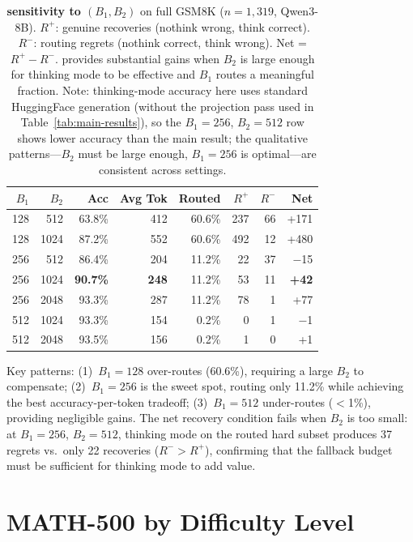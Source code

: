 \begin{table}[ht]
\centering
\caption{\textbf{\method{} sensitivity to $(B_1, B_2)$} on full GSM8K
($n{=}1{,}319$, Qwen3-8B).
$R^+$: genuine recoveries (nothink wrong, think correct).
$R^-$: routing regrets (nothink correct, think wrong).
Net = $R^+ - R^-$.
\method{} provides substantial gains when $B_2$ is large enough for
thinking mode to be effective and $B_1$ routes a meaningful fraction.
Note: thinking-mode accuracy here uses standard HuggingFace generation
(without the projection pass used in Table~\ref{tab:main-results}),
so the $B_1{=}256$, $B_2{=}512$ row shows lower accuracy than the main
\method{} result; the qualitative patterns---$B_2$ must be large
enough, $B_1{=}256$ is optimal---are consistent across settings.}
\label{tab:town-grid}
\small
\begin{tabular}{rr|rrrrrr}
\toprule
$B_1$ & $B_2$ & \textbf{Acc} & \textbf{Avg Tok} & \textbf{Routed} & $R^+$ & $R^-$ & \textbf{Net} \\
\midrule
128 & 512 & 63.8\% & 412 & 60.6\% & 237 & 66 & +171 \\
128 & 1024 & 87.2\% & 552 & 60.6\% & 492 & 12 & +480 \\
\midrule
256 & 512 & 86.4\% & 204 & 11.2\% & 22 & 37 & $-$15 \\
256 & 1024 & \textbf{90.7\%} & \textbf{248} & 11.2\% & 53 & 11 & \textbf{+42} \\
256 & 2048 & 93.3\% & 287 & 11.2\% & 78 & 1 & +77 \\
\midrule
512 & 1024 & 93.3\% & 154 & 0.2\% & 0 & 1 & $-$1 \\
512 & 2048 & 93.5\% & 156 & 0.2\% & 1 & 0 & +1 \\
\bottomrule
\end{tabular}
\end{table}

Key patterns: (1)~$B_1{=}128$ over-routes (60.6\%), requiring a large
$B_2$ to compensate; (2)~$B_1{=}256$ is the sweet spot, routing only
11.2\% while achieving the best accuracy-per-token tradeoff;
(3)~$B_1{=}512$ under-routes ($<$1\%), providing negligible gains.
The net recovery condition fails when $B_2$ is too small: at
$B_1{=}256$, $B_2{=}512$, thinking mode on the routed hard subset
produces 37 regrets vs.\ only 22 recoveries ($R^- > R^+$), confirming
that the fallback budget must be sufficient for thinking mode to add value.

\section{MATH-500 by Difficulty Level}
\label{app:math500-level}

